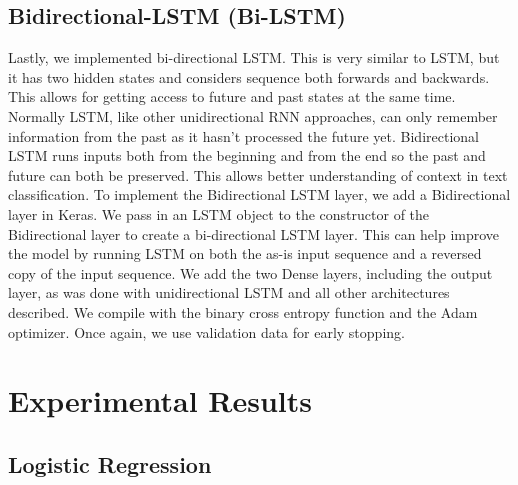 \documentclass[sigconf]{acmart}
\begin{document}
\subsection{Bidirectional-LSTM (Bi-LSTM)}
Lastly, we implemented bi-directional LSTM.  This is very similar to LSTM, but it has two hidden states and considers sequence both forwards and backwards. This allows for getting access to future and past states at the same time. Normally LSTM, like other unidirectional RNN approaches, can only remember information from the past as it hasn't processed the future yet. Bidirectional LSTM runs inputs both from the beginning and from the end so the past and future can both be preserved.  This allows better understanding of context in text classification. To implement the Bidirectional LSTM layer, we add a Bidirectional layer in Keras. We pass in an LSTM object to the constructor of the Bidirectional layer to create a bi-directional LSTM layer. This can help improve the model by running LSTM on both the as-is input sequence and a reversed copy of the input sequence. We add the two Dense layers, including the output layer, as was done with unidirectional LSTM and all other architectures described. We compile with the binary cross entropy function and the Adam optimizer.  Once again, we use validation data for early stopping. 

\section{Experimental Results}
\subsection{Logistic Regression}
\end{document}
